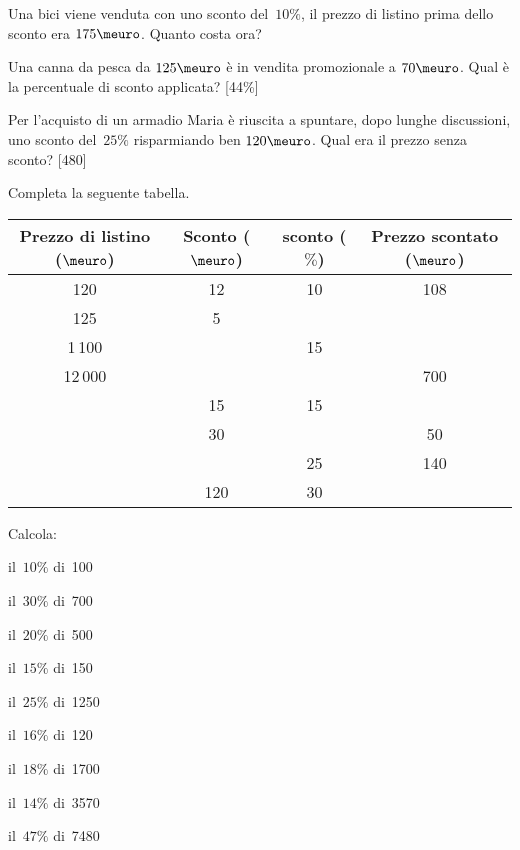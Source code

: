 \begin{esercizio}
 \label{ese:3.86}
 Una bici viene venduta con uno sconto del~\(10\%\), il prezzo di listino 
 prima dello sconto era \(175\meuro\). Quanto costa ora?
\end{esercizio}

\begin{esercizio}[*]
 \label{ese:3.87}
Una canna da pesca da \(125\meuro\) è in vendita promozionale a 
\(70\meuro\). Qual è la percentuale di sconto applicata? \hfill [44\%]
\end{esercizio}

\begin{esercizio}[*]
 \label{ese:3.88}
Per l'acquisto di un armadio Maria è riuscita a spuntare, dopo lunghe 
discussioni, uno sconto del~\(25\%\) risparmiando ben \(120\meuro\). 
Qual era il prezzo senza sconto? \hfill [480]
\end{esercizio}


\begin{esercizio}
\label{ese:3.89}
Completa la seguente tabella.

\begin{tabular*}{.9\textwidth}{@{\extracolsep{\fill}}*{4}{|c}|}
\hline
Prezzo di listino (\(\meuro\))&Sconto (\(\meuro\))& 
sconto (\(\%\))&Prezzo scontato (\(\meuro\))\\
 & 12 & 10 & 108\\ \hline
125&5&&\\ \hline
1\,100&&15&\\ \hline
12\,000&&&700\\ \hline
&15&15&\\ \hline
&30&&50\\ \hline
&&25&140\\ \hline
&120&30&\\ \hline
\end{tabular*}
\end{esercizio}

\begin{esercizio}
\label{ese:3.90}
Calcola:

\begin{htmulticols}{3}
\begin{enumeratees}
\item il~\(10\%\) di~100
\item il~\(30\%\) di~700
\item il~\(20\%\) di~500
\item il~\(15\%\) di~150
\item il~\(25\%\) di~1250
\item il~\(16\%\) di~120
\item il~\(18\%\) di~1700
\item il~\(14\%\) di~3570
\item il~\(47\%\) di~7480
\end{enumeratees}
\end{htmulticols}
\end{esercizio}

